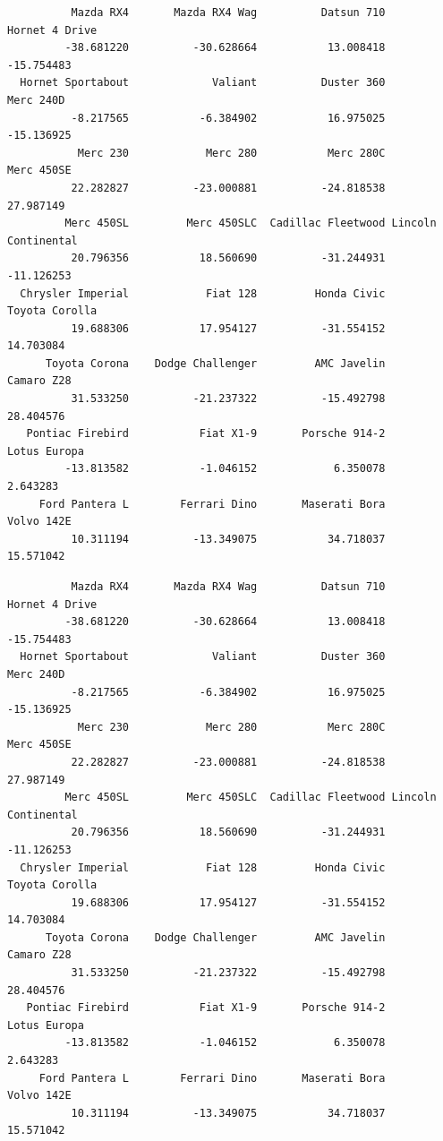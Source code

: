 \documentclass[
]{book}
\newenvironment{Shaded}{\begin{snugshade}}{\end{snugshade}}
\newcommand{\CommentTok}[1]{\textcolor[rgb]{0.56,0.35,0.01}{\textit{#1}}}
\newcommand{\NormalTok}[1]{#1}
\newcommand{\SpecialCharTok}[1]{\textcolor[rgb]{0.00,0.00,0.00}{#1}}
\begin{document}
\begin{verbatim}
          Mazda RX4       Mazda RX4 Wag          Datsun 710      Hornet 4 Drive 
         -38.681220          -30.628664           13.008418          -15.754483 
  Hornet Sportabout             Valiant          Duster 360           Merc 240D 
          -8.217565           -6.384902           16.975025          -15.136925 
           Merc 230            Merc 280           Merc 280C          Merc 450SE 
          22.282827          -23.000881          -24.818538           27.987149 
         Merc 450SL         Merc 450SLC  Cadillac Fleetwood Lincoln Continental 
          20.796356           18.560690          -31.244931          -11.126253 
  Chrysler Imperial            Fiat 128         Honda Civic      Toyota Corolla 
          19.688306           17.954127          -31.554152           14.703084 
      Toyota Corona    Dodge Challenger         AMC Javelin          Camaro Z28 
          31.533250          -21.237322          -15.492798           28.404576 
   Pontiac Firebird           Fiat X1-9       Porsche 914-2        Lotus Europa 
         -13.813582           -1.046152            6.350078            2.643283 
     Ford Pantera L        Ferrari Dino       Maserati Bora          Volvo 142E 
          10.311194          -13.349075           34.718037           15.571042 
\end{verbatim}

\begin{Shaded}
\end{Shaded}

\begin{verbatim}
          Mazda RX4       Mazda RX4 Wag          Datsun 710      Hornet 4 Drive 
         -38.681220          -30.628664           13.008418          -15.754483 
  Hornet Sportabout             Valiant          Duster 360           Merc 240D 
          -8.217565           -6.384902           16.975025          -15.136925 
           Merc 230            Merc 280           Merc 280C          Merc 450SE 
          22.282827          -23.000881          -24.818538           27.987149 
         Merc 450SL         Merc 450SLC  Cadillac Fleetwood Lincoln Continental 
          20.796356           18.560690          -31.244931          -11.126253 
  Chrysler Imperial            Fiat 128         Honda Civic      Toyota Corolla 
          19.688306           17.954127          -31.554152           14.703084 
      Toyota Corona    Dodge Challenger         AMC Javelin          Camaro Z28 
          31.533250          -21.237322          -15.492798           28.404576 
   Pontiac Firebird           Fiat X1-9       Porsche 914-2        Lotus Europa 
         -13.813582           -1.046152            6.350078            2.643283 
     Ford Pantera L        Ferrari Dino       Maserati Bora          Volvo 142E 
          10.311194          -13.349075           34.718037           15.571042 
\end{verbatim}
\end{document}
